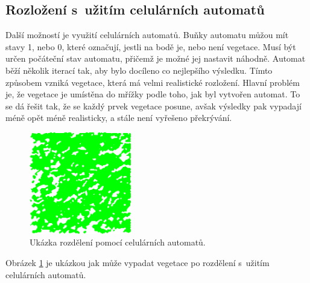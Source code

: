 \subsection*{Rozložení s~užitím celulárních automatů}
Další možností je využití celulárních automatů. Buňky automatu můžou mít stavy 1, nebo 0, které označují, jestli na bodě je, nebo není vegetace. Musí být určen počáteční stav automatu, přičemž je možné jej nastavit náhodně. Automat běží několik iterací tak, aby bylo docíleno co nejlepšího výsledku. Tímto způsobem vzniká vegetace, která má velmi realistické rozložení. Hlavní problém je, že vegetace je umístěna do mřížky podle toho, jak byl vytvořen automat. To se dá řešit tak, že se každý prvek vegetace posune, avšak výsledky pak vypadají méně opět méně realisticky, a stále není vyřešeno překrývání.
\begin{figure}[H]
	\centering
	\includegraphics[width=12em]{images/generation/cellular.png}
	\caption[caption]{Ukázka rozdělení pomocí celulárních automatů. \footnotemark}
	\label{cellular_vegetation}
\end{figure}


Obrázek \ref{cellular_vegetation} je ukázkou jak může vypadat vegetace po rozdělení s~užitím celulárních automatů.


